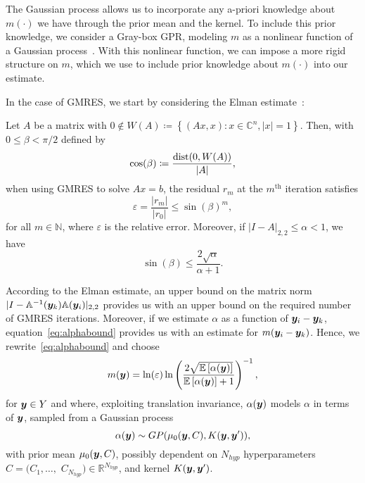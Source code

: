 The Gaussian process allows us to incorporate any a-priori knowledge about $m(\cdot)$ we have through the prior mean and the kernel.
To include this prior knowledge, we consider a Gray-box GPR, modeling $m$ as a nonlinear function of a Gaussian process~\cite{astudillo2022}.
With this nonlinear function, we can impose a more rigid structure on $m$, which we use to include prior knowledge about $m(\cdot)$ into our estimate.

In the case of GMRES, we start by considering the Elman estimate~\cite{elman1982,graham2021}:
\begin{theorem}
    Let $A$ be a matrix with $0 \notin W(A) \coloneqq \left\{ (Ax, x): x \in \mathbb{C}^n, |x|=1 \right\}$.
    Then, with $0 \leq \beta < \pi/2$ defined by
    \begin{equation}
        \cos(\beta) \coloneqq \frac{\operatorname*{dist}(0, W(A))}{|A|}\label{eq:betadef},
    \end{equation}
    when using GMRES to solve $Ax=b$, the residual $r_m$ at the $m^\text{th}$ iteration satisfies
    \begin{equation}
        \varepsilon=\frac{|r_m|}{|r_0|}\leq \sin(\beta)^m\label{eq:elmanest},
    \end{equation}
    for all $m\in\mathbb{N}$,
    where $\varepsilon$ is the relative error.
    Moreover, if $|I-A|_{2,2}\leq \alpha < 1$, we have
    \begin{equation}
        \sin(\beta) \leq \frac{2\sqrt{\alpha}}{\alpha + 1}.\label{eq:alphabound}
    \end{equation}
\end{theorem}
According to the Elman estimate, an upper bound on the matrix norm $|I-\mathbb{A}^{-1}({\bm{y}}_k)\mathbb{A}({\bm{y}}_i)|_{2,2}$ provides us with an upper bound on the required number of GMRES iterations.
Moreover, if we estimate $\alpha$ as a function of ${\bm{y}}_i-{\bm{y}}_k$, equation~\eqref{eq:alphabound} provides us with an estimate for $m({\bm{y}}_i-{\bm{y}}_k)$.
Hence, we rewrite~\eqref{eq:alphabound} and choose
\begin{equation}
    m({\bm{y}})=\ln(\varepsilon)\ln\left( \frac{2\sqrt{\mathbb{E}\left[\alpha({\bm{y}})\right]}}{\mathbb{E}\left[\alpha({\bm{y}})\right] + 1} \right)^{-1}\label{eq:mdef},
\end{equation}
for ${\bm{y}}\in Y$ and where, exploiting translation invariance, $\alpha({\bm{y}})$ models $\alpha$ in terms of ${\bm{y}}$, sampled from a Gaussian process
\begin{equation}
    \alpha({\bm{y}}) \sim GP(\mu_0({\bm{y}}, C), K({\bm{y}}, {\bm{y}}'))\label{eq:alpha_GP_def},
\end{equation}
with prior mean $\mu_0({\bm{y}}, C)$, possibly dependent on $N_{hyp}$ hyperparameters $C=( C_1, \ldots,$ $ C_{N_{hyp}} )\in\mathbb{R}^{N_{hyp}}$, and kernel $K({\bm{y}}, {\bm{y}}')$.

